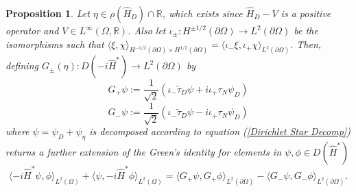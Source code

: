 \documentclass{article}
\numberwithin{equation}{section}
\newtheorem{proposition}{Proposition}[section]
\begin{document}
\begin{proposition}\label{Current Decomposition}
        Let $\eta \in \rho(\hat{H}_D)\cap \mathbb{R}$, which exists since $\hat{H}_D-V$ is a positive operator and $V \in L^\infty(\Omega,\mathbb{R})$. Also let $\iota_\pm:H^{\pm {1/2}}(\partial \Omega)\to L^2(\partial \Omega)$ be the isomorphisms such that $\langle \xi,\chi \rangle_{H^{-1/2}(\partial \Omega) \times H^{1/2}(\partial \Omega)}=\langle \iota _- \xi, \iota_+ \chi \rangle_{L^2(\partial \Omega)}$. Then, defining $G_\pm(\eta): D(-i\hat{H}^*)\to L^2(\partial \Omega)$ by
    \begin{equation}
        G_+\psi:=\frac{1}{\sqrt{2}}\left(\iota_- \tilde{\tau}_D \psi  + i \iota_+ \tau_N \psi_D\right)
    \end{equation}
    \begin{equation}
        G_-\psi:=\frac{1}{\sqrt{2}}\left(\iota_-\tilde{\tau}_D \psi  - i \iota_+ \tau_N  \psi_D \right)
    \end{equation}
    where $\psi=\psi_D + \psi_\eta$ is decomposed according to equation (\ref{Dirichlet Star Decomp}) returns a further extension of the Green's identity for elements in $\psi, \phi \in D(\hat{H}^*)$
    \begin{equation}\label{Current Star Decomp Eq}
        \langle -i\hat{H}^* \psi,\phi \rangle_{L^2(\Omega)} + \langle \psi,-i\hat{H}^* \phi \rangle_{L^2(\Omega)}=\langle G_+\psi,G_+\phi \rangle_{L^2(\partial \Omega)} - \langle G_-\psi,G_- \phi \rangle_{L^2(\partial \Omega)}.
    \end{equation}
        \end{proposition}
\end{document}
